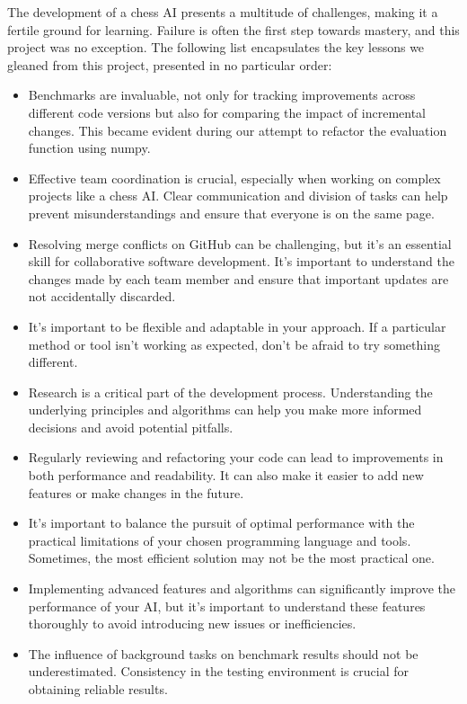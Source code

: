 The development of a chess AI presents a multitude of challenges, making it a fertile ground for learning. Failure is often the first step towards mastery, and this project was no exception. The following list encapsulates the key lessons we gleaned from this project, presented in no particular order:

\begin{itemize}
\item Benchmarks are invaluable, not only for tracking improvements across different code versions but also for comparing the impact of incremental changes. This became evident during our attempt to refactor the evaluation function using numpy.
\item Effective team coordination is crucial, especially when working on complex projects like a chess AI. Clear communication and division of tasks can help prevent misunderstandings and ensure that everyone is on the same page.
\item Resolving merge conflicts on GitHub can be challenging, but it's an essential skill for collaborative software development. It's important to understand the changes made by each team member and ensure that important updates are not accidentally discarded.
\item It's important to be flexible and adaptable in your approach. If a particular method or tool isn't working as expected, don't be afraid to try something different.
\item Research is a critical part of the development process. Understanding the underlying principles and algorithms can help you make more informed decisions and avoid potential pitfalls.
\item Regularly reviewing and refactoring your code can lead to improvements in both performance and readability. It can also make it easier to add new features or make changes in the future.
\item It's important to balance the pursuit of optimal performance with the practical limitations of your chosen programming language and tools. Sometimes, the most efficient solution may not be the most practical one.
\item Implementing advanced features and algorithms can significantly improve the performance of your AI, but it's important to understand these features thoroughly to avoid introducing new issues or inefficiencies.
\item The influence of background tasks on benchmark results should not be underestimated. Consistency in the testing environment is crucial for obtaining reliable results.

\end{itemize}

